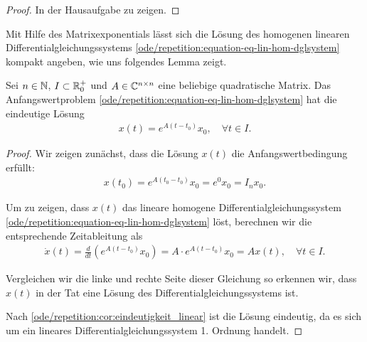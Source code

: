 \begin{proof}
 In der Hausaufgabe zu zeigen.
\end{proof}

\par
Mit Hilfe des Matrixexponentials lässt sich die Lösung des homogenen linearen Differentialgleichungssystems \cref{ode/repetition:equation-eq-lin-hom-dglsystem} kompakt angeben, wie uns folgendes Lemma zeigt.
\label{ode/repetition:lemma-15}
\begin{lemma}{}{}



\par
Sei \(n\in \mathbb{N}\), \(I \subset \mathbb{R}^+_0\) und \(A \in \mathbb{C}^{n\times n}\) eine beliebige quadratische Matrix.
Das Anfangswertproblem \cref{ode/repetition:equation-eq-lin-hom-dglsystem} hat die eindeutige Lösung
\begin{align*}
x(t) = e^{A(t-t_0)}x_0, \quad \forall t \in I.
\end{align*}\end{lemma}

\begin{proof}
 Wir zeigen zunächst, dass die Lösung \(x(t)\) die Anfangswertbedingung erfüllt:
\begin{align*}
x(t_0) = e^{A(t_0-t_0)}x_0 = e^0x_0 = I_n x_0.
\end{align*}
\par
Um zu zeigen, dass \(x(t)\) das lineare homogene Differentialgleichungssystem \cref{ode/repetition:equation-eq-lin-hom-dglsystem} löst, berechnen wir die entsprechende Zeitableitung als
\begin{align*}
\dot{x}(t) = \frac{d}{dt}(e^{A(t-t_0)}x_0) = A \cdot e^{A(t-t_0)}x_0 = A x(t), \quad \forall t \in I.
\end{align*}
\par
Vergleichen wir die linke und rechte Seite dieser Gleichung so erkennen wir, dass \(x(t)\) in der Tat eine Lösung des Differentialgleichungssystems ist.

\par
Nach \cref{ode/repetition:cor:eindeutigkeit_linear} ist die Lösung eindeutig, da es sich um ein lineares Differentialgleichungssystem 1. Ordnung handelt.
\end{proof}

